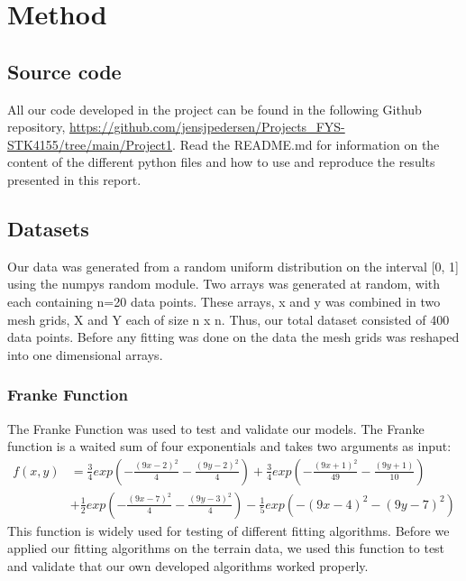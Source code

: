 \section{Method}



\subsection{Source code}
All our code developed in the project can be found in the following Github
repository, \url{https://github.com/jensjpedersen/Projects_FYS-STK4155/tree/main/Project1}. Read the README.md for information on the content of the
different python files and how to use and reproduce the results presented in
this report.  


\subsection{Datasets}
Our data was generated from a random uniform distribution on the interval [0,
1] using the numpys random module. Two arrays was generated at random, with each containing n=20 data points. 
These arrays, x and y was combined in two mesh grids, X and Y each of size n x n. Thus, our
total dataset consisted of 400 data points. Before any fitting was done on the
data the mesh grids was reshaped into one dimensional arrays.  

\subsubsection{Franke Function}

The Franke Function was used to test and validate our models.
The Franke function is a waited sum of four exponentials and takes two
arguments as input: 
\begin{align}
    \label{eq:franke_function} 
    f(x,y) &= \frac{3}{4}exp\left(-\frac{(9x-2)^2}{4}-\frac{(9y-2)^2}{4} \right)
    + \frac{3}{4}exp\left(-\frac{(9x+1)^2}{49}-\frac{(9y+1)}{10} \right) \\
           &+ \frac{1}{2}exp\left(-\frac{(9x-7)^2}{4}-\frac{(9y-3)^2}{4}
           \right)-\frac{1}{5}exp(-(9x-4)^2-(9y-7)^2)
\end{align}
This function is widely used for testing of different fitting algorithms. 
Before we applied our fitting algorithms on the terrain data, we used this function
to test and validate that our own developed algorithms worked properly.    

